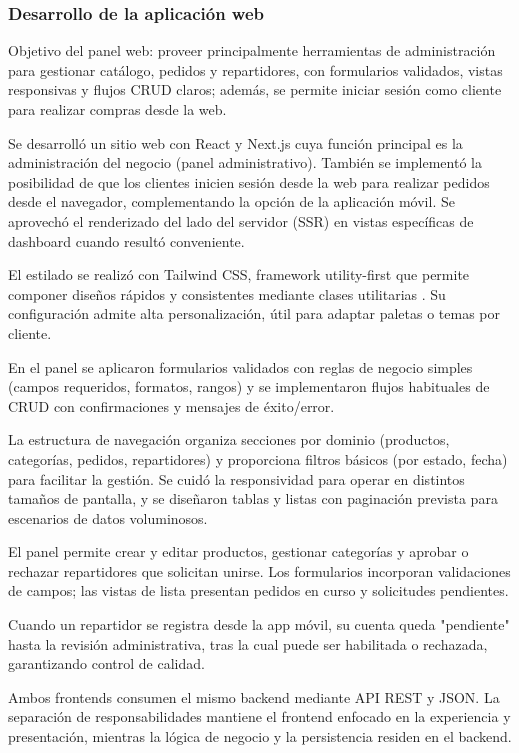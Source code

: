   \subsubsection{Desarrollo de la aplicación web}

  Objetivo del panel web: proveer principalmente herramientas de administración para gestionar catálogo, pedidos y repartidores, con formularios validados, vistas responsivas y flujos CRUD claros; además, se permite iniciar sesión como cliente para realizar compras desde la web.

  Se desarrolló un sitio web con React y Next.js cuya función principal es la administración del negocio (panel administrativo). También se implementó la posibilidad de que los clientes inicien sesión desde la web para realizar pedidos desde el navegador, complementando la opción de la aplicación móvil. Se aprovechó el renderizado del lado del servidor (SSR) en vistas específicas de dashboard cuando resultó conveniente.

  El estilado se realizó con Tailwind CSS, framework utility-first que permite componer diseños
  rápidos y consistentes mediante clases utilitarias \parencite{TailwindCSS_docs}. Su configuración admite alta
  personalización, útil para adaptar paletas o temas por cliente.

  En el panel se aplicaron formularios validados con reglas de negocio simples (campos requeridos,
  formatos, rangos) y se implementaron flujos habituales de CRUD con confirmaciones y mensajes
  de éxito/error.

  La estructura de navegación organiza secciones por dominio (productos, categorías, pedidos,
  repartidores) y proporciona filtros básicos (por estado, fecha) para facilitar la gestión. Se cuidó
  la responsividad para operar en distintos tamaños de pantalla, y se diseñaron tablas y listas con
  paginación prevista para escenarios de datos voluminosos.

  El panel permite crear y editar productos, gestionar categorías y aprobar o rechazar repartidores que solicitan unirse. Los formularios incorporan validaciones de campos; las vistas de lista presentan
  pedidos en curso y solicitudes pendientes.

  Cuando un repartidor se registra desde la app móvil, su cuenta queda "pendiente" hasta la
  revisión administrativa, tras la cual puede ser habilitada o rechazada, garantizando control de
  calidad.

  Ambos frontends consumen el mismo backend mediante API REST y JSON. La separación
  de responsabilidades mantiene el frontend enfocado en la experiencia y presentación, mientras la
  lógica de negocio y la persistencia residen en el backend.

